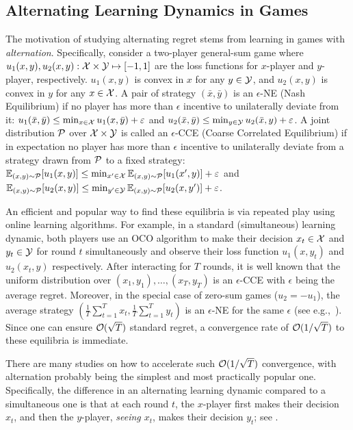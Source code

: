 \subsection{Alternating Learning Dynamics in Games}\label{sec:alt-game}
The motivation of studying alternating regret stems from learning in games with \textit{alternation}. Specifically, consider a two-player general-sum game 
where $u_1(x,y), u_2(x,y):{\mathcal{X}}\times{\mathcal{Y}}\mapsto[-1,1]$ are the loss functions for $x$-player and $y$-player, respectively. $u_1(x,y)$ is convex in $x$ for any $y\in{\mathcal{Y}}$, and $u_2(x,y)$ is convex in $y$ for any $x\in{\mathcal{X}}$. 
A pair of strategy $(\bar{x}, \bar{y})$ is an $\epsilon$-NE (Nash Equilibrium) if no player has more than $\epsilon$ incentive to unilaterally deviate from it: $u_1(\bar{x}, \bar{y}) \leq \min_{x\in{\mathcal{X}}} u_1(x, \bar{y}) + \varepsilon$
and $u_2(\bar{x}, \bar{y}) \leq \min_{y\in{\mathcal{Y}}} u_2(\bar{x}, y) + \varepsilon$.
A joint distribution ${\mathcal{P}}$ over ${\mathcal{X}} \times {\mathcal{Y}}$ is called an $\epsilon$-CCE (Coarse Correlated Equilibrium) if in expectation no player has more than $\epsilon$ incentive to unilaterally deviate from a strategy drawn from ${\mathcal{P}}$ to a fixed strategy: $\mathbb{E}_{(x,y)\sim {\mathcal{P}}}[u_1(x,y)] \leq \min_{x'\in{\mathcal{X}}}\mathbb{E}_{(x,y)\sim {\mathcal{P}}}[u_1(x',y)] + \varepsilon$ and $\mathbb{E}_{(x,y)\sim {\mathcal{P}}}[u_2(x,y)] \leq \min_{y'\in{\mathcal{Y}}}\mathbb{E}_{(x,y)\sim {\mathcal{P}}}[u_2(x,y')] + \varepsilon$.

An efficient and popular way to find these equilibria is via repeated play using online learning algorithms.
For example, in a standard (simultaneous) learning dynamic, both players use an OCO algorithm to make their decision $x_t \in {\mathcal{X}}$ and $y_t \in {\mathcal{Y}}$ for round $t$ simultaneously and observe their loss function $u_1(x, y_t)$ and $u_2(x_t, y)$ respectively. 
After interacting for $T$ rounds, it is well known that the uniform distribution over $(x_1, y_1), \dots, (x_T, y_T)$ is an $\epsilon$-CCE with $\epsilon$ being the average regret.
Moreover, in the special case of zero-sum games ($u_2 = -u_1$), the average strategy $(\frac{1}{T}\sum_{t=1}^T x_t, \frac{1}{T}\sum_{t=1}^T y_t)$
is an $\epsilon$-NE for the same $\epsilon$ (see e.g.,~\citealp{freund1999adaptive}).
Since one can ensure $\mathcal{O}(\sqrt{T})$ standard regret, a convergence rate of $\mathcal{O}(1/\sqrt{T})$ to these equilibria is immediate.

There are many studies on how to accelerate such  $\mathcal{O}(1/\sqrt{T})$ convergence, with alternation probably being the simplest and most practically popular one.
Specifically, the difference in an alternating learning dynamic compared to a simultaneous one is that at each round $t$, the $x$-player first makes their decision $x_t$, and then the $y$-player, \emph{seeing $x_t$}, makes their decision $y_t$; see .

